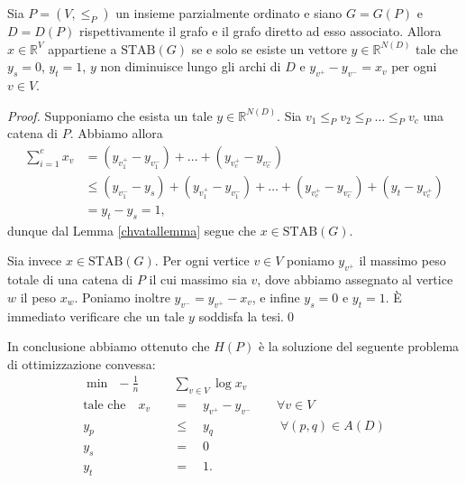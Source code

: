 \begin{lemma}
  Sia \(P=(V,\le_{P})\) un insieme parzialmente ordinato e siano \(G=G(P)\) e \(D=D(P)\) rispettivamente il grafo e il grafo diretto ad esso associato. Allora \(x\in\mathbb{R}^V\) appartiene a \(\text{STAB}(G)\) se e solo se esiste un vettore \(y\in \mathbb{R}^{N(D)}\) tale che \(y_s=0\), \(y_t=1\), \(y\) non diminuisce lungo gli archi di \(D\) e \(y_{v^+}-y_{v^-}=x_v\) per ogni \(v\in V\).
\end{lemma}
\begin{proof}
  Supponiamo che esista un tale \(y\in\mathbb{R}^{N(D)}\). Sia \(v_1\le_{P} v_2\le_{P}\dots\le_{P}v_c\) una catena di \(P\). Abbiamo allora
  \begin{align}
    \sum_{i=1}^{c}{x_v} &= (y_{v_{1}^+} - y_{v_{1}^-}) + \dots + (y_{v_{c}^+} - y_{v_{c}^-}) \nonumber \\
    &\le (y_{v_{1}^-} - y_s) + (y_{v_{1}^+} - y_{v_{1}^-}) + \dots + (y_{v_{c}^+} - y_{v_{c}^-}) + (y_t - y_{v_{c}^+})\nonumber \\
    &= y_t - y_s = 1\text{,}\nonumber
  \end{align}
  dunque dal Lemma \ref{chvatallemma} segue che \(x\in\text{STAB}(G)\).
  
  Sia invece \(x\in\text{STAB}(G)\). Per ogni vertice \(v\in V\) poniamo \(y_{v^+}\) il massimo peso totale di una catena di \(P\) il cui massimo sia \(v\), dove abbiamo assegnato al vertice \(w\) il peso \(x_w\). Poniamo inoltre \(y_{v^-} = y_{v^+} - x_v\), e infine \(y_s = 0\) e \(y_t = 1\). È immediato verificare che un tale \(y\) soddisfa la tesi.\qed
\end{proof}

In conclusione abbiamo ottenuto che \(H(P)\) è la soluzione del seguente problema di ottimizzazione convessa:
\begin{align}
  \min\;\,-\frac{1}{n}&\sum_{v\in V}{\log{x_v}} \nonumber \\
  \text{tale che}\quad x_v\quad &=\quad y_{v^+} - y_{v^-}\qquad\forall v\in V\nonumber \\
  y_p\quad &\le\quad y_q \qquad\qquad\quad\;\forall (p,q)\in A(D)\nonumber \\
  y_s\quad &=\quad 0 \nonumber \\
  y_t\quad &=\quad 1\text{.} \nonumber
\end{align}
